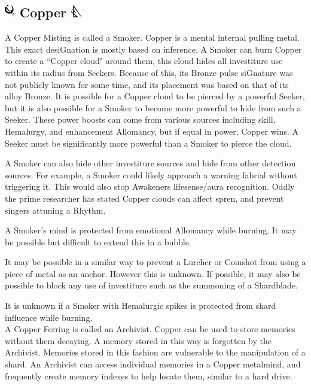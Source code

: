 \documentclass[conference]{IEEEtran}
\begin{document}
\subsection*{\includegraphics[height=1em]{images/Copper.png}  Copper \includegraphics[height=1em]{images/Copper_(Feruchemy).png}}
A Copper Misting is called a Smoker.  Copper is a mental internal pulling metal.  This exact desiGnation is mostly based on inference.  A Smoker can burn Copper to create a ``Copper cloud" around them, this cloud hides all investiture use within its radius from Seekers.  Because of this, its Bronze pulse siGnature was not publicly known for some time, and its placement was based on that of its alloy Bronze.  
It is possible for a Copper cloud to be pierced by a powerful Seeker, but it is also possible for a Smoker to become more powerful to hide from such a Seeker.  These power boosts can come from various sources including skill, Hemalurgy, and enhancement Allomancy, but if equal in power, Copper wins.  A Seeker must be significantly more powerful than a Smoker to pierce the cloud.

A Smoker can also hide other investiture sources and hide from other detection sources.  For example, a Smoker could likely approach a warning fabrial without triggering it.  This would also stop Awakeners lifesense/aura recognition.  Oddly the prime researcher has stated Copper clouds can affect spren, and prevent singers attuning a Rhythm.

A Smoker's mind is protected from emotional Allomancy while burning.  It may be possible but difficult to extend this in a bubble.

It may be possible in a similar way to prevent a Lurcher or Coinshot from using a piece of metal as an anchor.  However this is unknown.  If possible, it may also be possible to block any use of investiture such as the summoning of a Shardblade.

It is unknown if a Smoker with Hemalurgic spikes is protected from shard influence while burning.\\

A Copper Ferring is called an Archivist.  Copper can be used to store memories without them decaying.  A memory stored in this way is forgotten by the Archivist.  Memories stored in this fashion are vulnerable to the manipulation of a shard.  An Archivist can access individual memories in a Copper metalmind, and frequently create memory indexes to help locate them, similar to a hard drive.
\end{document}
